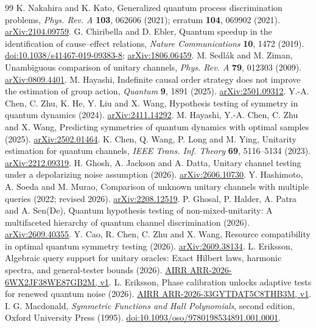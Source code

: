 \documentclass[11pt,a4paper]{article}
\theoremstyle{remark}\newtheorem{remark}[theorem]{Remark}
\begin{document}
\begin{thebibliography}{99}\small
{} K. Nakahira and K. Kato, Generalized quantum process discrimination problems, \emph{Phys. Rev. A} \textbf{103}, 062606 (2021); erratum \textbf{104}, 069902 (2021). \href{https://arxiv.org/abs/2104.09759}{arXiv:2104.09759}.
 G. Chiribella and D. Ebler, Quantum speedup in the identification of cause--effect relations, \emph{Nature Communications} \textbf{10}, 1472 (2019). \href{https://doi.org/10.1038/s41467-019-09383-8}{doi:10.1038/s41467-019-09383-8}; \href{https://arxiv.org/abs/1806.06459}{arXiv:1806.06459}.
 M. Sedl{\'a}k and M. Ziman, Unambiguous comparison of unitary channels, \emph{Phys. Rev. A} \textbf{79}, 012303 (2009). \href{https://arxiv.org/abs/0809.4401}{arXiv:0809.4401}.
 M. Hayashi, Indefinite causal order strategy does not improve the estimation of group action, \emph{Quantum} \textbf{9}, 1891 (2025). \href{https://arxiv.org/abs/2501.09312}{arXiv:2501.09312}.
 Y.-A. Chen, C. Zhu, K. He, Y. Liu and X. Wang, Hypothesis testing of symmetry in quantum dynamics (2024). \href{https://arxiv.org/abs/2411.14292}{arXiv:2411.14292}.
 M. Hayashi, Y.-A. Chen, C. Zhu and X. Wang, Predicting symmetries of quantum dynamics with optimal samples (2025). \href{https://arxiv.org/abs/2502.01464}{arXiv:2502.01464}.
 K. Chen, Q. Wang, P. Long and M. Ying, Unitarity estimation for quantum channels, \emph{IEEE Trans. Inf. Theory} \textbf{69}, 5116--5134 (2023). \href{https://arxiv.org/abs/2212.09319}{arXiv:2212.09319}.
 H. Ghosh, A. Jackson and A. Datta, Unitary channel testing under a depolarizing noise assumption (2026). \href{https://arxiv.org/abs/2606.10730}{arXiv:2606.10730}.
 Y. Hashimoto, A. Soeda and M. Murao, Comparison of unknown unitary channels with multiple queries (2022; revised 2026). \href{https://arxiv.org/abs/2208.12519}{arXiv:2208.12519}.
 P. Ghosal, P. Halder, A. Patra and A. Sen(De), Quantum hypothesis testing of non-mixed-unitarity: A multifaceted hierarchy of quantum channel discrimination (2026). \href{https://arxiv.org/abs/2609.40355}{arXiv:2609.40355}.
 Y. Cao, R. Chen, C. Zhu and X. Wang, Resource compatibility in optimal quantum symmetry testing (2026). \href{https://arxiv.org/abs/2609.38134}{arXiv:2609.38134}.
 L. Eriksson, Algebraic query support for unitary oracles: Exact Hilbert laws, harmonic spectra, and general-tester bounds (2026). \href{https://airr.science/papers/ARR-2026-6WX2JF38WE87GB2M/versions/v1/}{AIRR ARR-2026-6WX2JF38WE87GB2M, v1}.
 L. Eriksson, Phase calibration unlocks adaptive tests for renewed quantum noise (2026). \href{https://airr.science/papers/ARR-2026-33GYTDAT5C8THB3M/versions/v1/}{AIRR ARR-2026-33GYTDAT5C8THB3M, v1}.
 I. G. Macdonald, \emph{Symmetric Functions and Hall Polynomials}, second edition, Oxford University Press (1995). \href{https://doi.org/10.1093/oso/9780198534891.001.0001}{doi:10.1093/oso/9780198534891.001.0001}.
\end{thebibliography}
\end{document}
